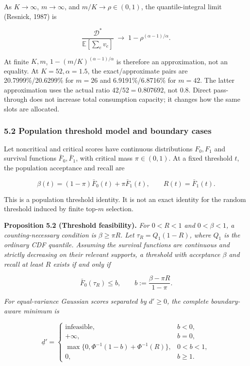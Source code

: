 \documentclass[
  11pt]{article}
\begin{document}
As \(K\to\infty\), \(m\to\infty\), and \(m/K\to\rho\in(0,1)\), the
quantile-integral limit (Resnick, 1987) is

\[\frac{\mathcal D^*}{\mathbb E[\sum_e v_e]}\;\longrightarrow\;1-\rho^{(\alpha-1)/\alpha}.\]

At finite \(K,m\), \(1-(m/K)^{(\alpha-1)/\alpha}\) is therefore an
approximation, not an equality. At \(K=52,\alpha=1.5\), the
exact/approximate pairs are 20.7999\%/20.6299\% for \(m=26\) and
6.9191\%/6.8716\% for \(m=42\). The latter approximation uses the actual
ratio \(42/52=0.807692\), not 0.8. Direct pass-through does not increase
total consumption capacity; it changes how the same slots are allocated.

\subsubsection{5.2 Population threshold model and boundary
cases}\label{population-threshold-model-and-boundary-cases}

Let noncritical and critical scores have continuous distributions
\(F_0,F_1\) and survival functions \(\bar F_0,\bar F_1\), with critical
mass \(\pi\in(0,1)\). At a fixed threshold \(t\), the population
acceptance and recall are

\[\beta(t)=(1-\pi)\bar F_0(t)+\pi\bar F_1(t),\qquad R(t)=\bar F_1(t).\]

This is a population threshold identity. It is not an exact identity for
the random threshold induced by finite top-\(m\) selection.

\textbf{Proposition 5.2 (Threshold feasibility).} \emph{For \(0<R<1\)
and \(0<\beta<1\), a counting-necessary condition is \(\beta\ge\pi R\).
Let \(\tau_R=Q_1(1-R)\), where \(Q_1\) is the ordinary CDF quantile.
Assuming the survival functions are continuous and strictly decreasing
on their relevant supports, a threshold with acceptance \(\beta\) and
recall at least \(R\) exists if and only if}

\[\bar F_0(\tau_R)\le b,\qquad b:=\frac{\beta-\pi R}{1-\pi}.\]

\emph{For equal-variance Gaussian scores separated by \(d'\ge0\), the
complete boundary-aware minimum is}

\[\underline d'=\begin{cases}
\text{infeasible},&b<0,\\
+\infty,&b=0,\\
\max\{0,\Phi^{-1}(1-b)+\Phi^{-1}(R)\},&0<b<1,\\
0,&b\ge1.
\end{cases}\]
\end{document}
